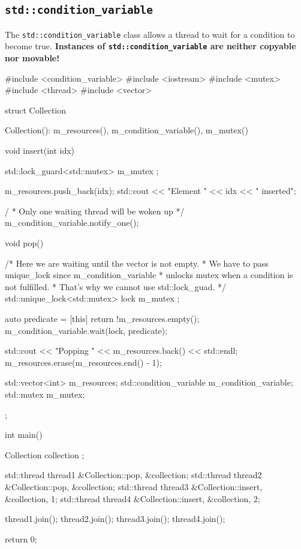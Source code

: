 \documentclass[../main]{subfiles}
\begin{document}
\subsection{\texttt{std::condition\_variable}}
    The \texttt{std::condition\_variable} class allows a thread to wait for
a condition to become true. \textbf{Instances of \texttt{std::condition\_variable} are neither copyable nor movable!}
\begin{Code}
    #include <condition_variable>
    #include <iostream>
    #include <mutex>
    #include <thread>
    #include <vector>

    struct Collection
    {
        Collection():
            m_resources(),
            m_condition_variable(),
            m_mutex()
        {
        }

        void insert(int idx)
        {
            std::lock_guard<std::mutex> { m_mutex };

            m_resources.push_back(idx);
            std::cout << "Element " << idx << " inserted\n";

            / * Only one waiting thread will be woken up */
            m_condition_variable.notify_one();
        }

        void pop()
        {
            /* Here we are waiting until the vector is not empty.
             * We have to pass unique_lock since m_condition_variable
             * unlocks mutex when a condition is not fulfilled.
             * That's why we cannot use std::lock_guad.
             */
            std::unique_lock<std::mutex> lock { m_mutex };

            auto predicate = [this]{ return !m_resources.empty(); }
            m_condition_variable.wait(lock, predicate);

            std::cout << "Popping " << m_resources.back() << std::endl;
            m_resources.erase(m_resources.end() - 1);
        }

        std::vector<int> m_resources;
        std::condition_variable m_condition_variable;
        std::mutex m_mutex;
    };

    int main()
    {
        Collection collection {};

        std::thread thread1 {&Collection::pop, &collection};
        std::thread thread2 {&Collection::pop, &collection};
        std::thread thread3 {&Collection::insert, &collection, 1};
        std::thread thread4 {&Collection::insert, &collection, 2};

        thread1.join();
        thread2.join();
        thread3.join();
        thread4.join();

        return 0;
    }
\end{Code}
\end{document}

